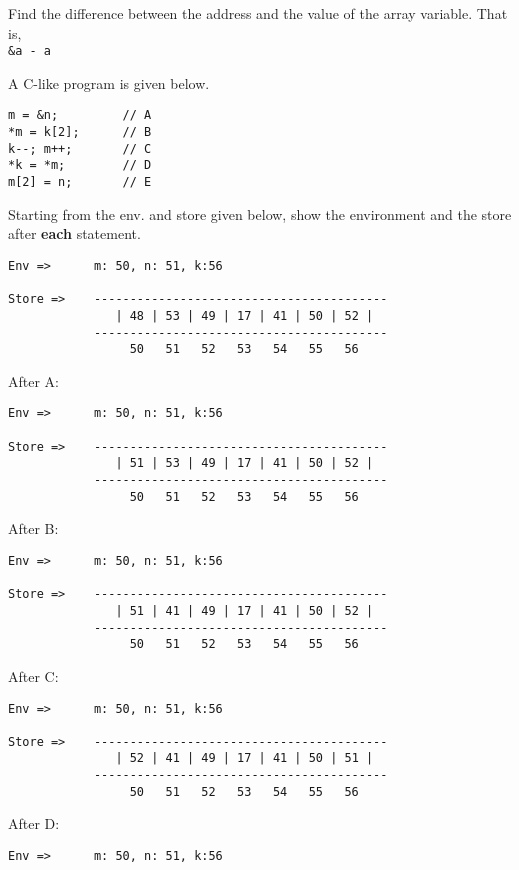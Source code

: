 \documentclass[addpoints]{exam}
\begin{document}
\begin{questions}
  \begin{solutionbox}{1.5cm}
  Find the difference between the address and the value
  of the array variable. That is,\\
  \texttt{\&a - a}
  \end{solutionbox}

  \question
  A C-like program is given below.
  \begin{verbatim}
m = &n;         // A
*m = k[2];      // B
k--; m++;       // C
*k = *m;        // D
m[2] = n;       // E
  \end{verbatim}
  Starting from the env. and store given below,
  show the environment and the store 
  after \textbf{each} statement.
{\small
\begin{verbatim}
Env =>      m: 50, n: 51, k:56

Store =>    -----------------------------------------
               | 48 | 53 | 49 | 17 | 41 | 50 | 52 |  
            -----------------------------------------
                 50   51   52   53   54   55   56   
\end{verbatim}}


  \begin{solution}
After A:
{\small
\begin{verbatim}
Env =>      m: 50, n: 51, k:56

Store =>    -----------------------------------------
               | 51 | 53 | 49 | 17 | 41 | 50 | 52 |  
            -----------------------------------------
                 50   51   52   53   54   55   56   
\end{verbatim}}

After B:
{\small
\begin{verbatim}
Env =>      m: 50, n: 51, k:56

Store =>    -----------------------------------------
               | 51 | 41 | 49 | 17 | 41 | 50 | 52 |  
            -----------------------------------------
                 50   51   52   53   54   55   56   
\end{verbatim}}

After C:
{\small
\begin{verbatim}
Env =>      m: 50, n: 51, k:56

Store =>    -----------------------------------------
               | 52 | 41 | 49 | 17 | 41 | 50 | 51 |  
            -----------------------------------------
                 50   51   52   53   54   55   56   
\end{verbatim}}

After D:
{\small
\begin{verbatim}
Env =>      m: 50, n: 51, k:56


\end{verbatim}}
\end{solution}
\end{questions}
\end{document}
